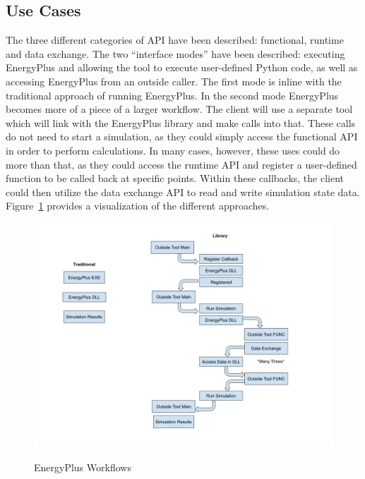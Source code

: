 \documentclass[5p, authoryear]{elsarticle}
\begin{document}
  \subsection{Use Cases}
The three different categories of API have been described: functional, runtime and data exchange.  The two “interface modes” have been described: executing EnergyPlus and allowing the tool to execute user-defined Python code, as well as accessing EnergyPlus from an outside caller.  The first mode is inline with the traditional approach of running EnergyPlus.  In the second mode EnergyPlus becomes more of a piece of a larger workflow.  The client will use a separate tool which will link with the EnergyPlus library and make calls into that.  These calls do not need to start a simulation, as they could simply access the functional API in order to perform calculations.  In many cases, however, these uses could do more than that, as they could access the runtime API and register a user-defined function to be called back at specific points.  Within these callbacks, the client could then utilize the data exchange API to read and write simulation state data.  Figure~\ref{figure:api:uses:workflows} provides a visualization of the different approaches.

\begin{figure}
\begin{center}
\label{figure:api:uses:workflows}
\includegraphics[width=\columnwidth]{images/api_workflows.png}
\caption{EnergyPlus Workflows}
\end{center}
\end{figure}
\end{document}
